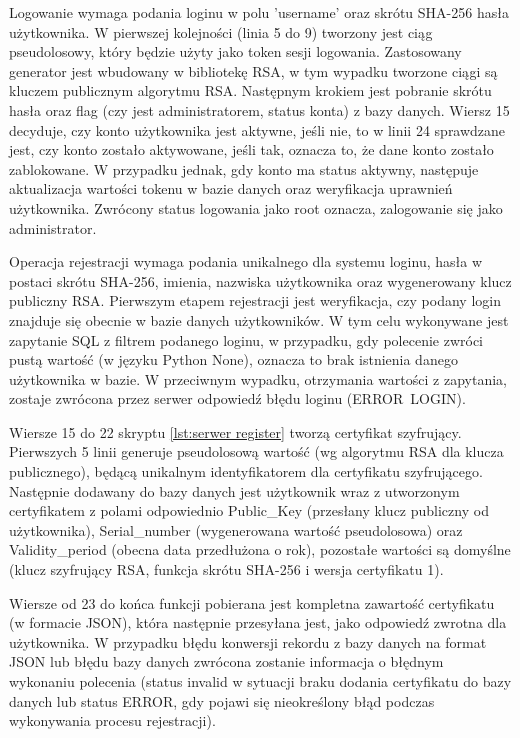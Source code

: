 	Logowanie wymaga podania loginu w polu 'username' oraz skrótu SHA-256 hasła użytkownika. W pierwszej kolejności (linia 5 do 9) tworzony jest ciąg pseudolosowy, który będzie użyty jako token sesji logowania. Zastosowany generator jest wbudowany w bibliotekę RSA, w tym wypadku tworzone ciągi są kluczem publicznym algorytmu RSA. Następnym krokiem jest pobranie skrótu hasła oraz flag (czy jest administratorem, status konta) z bazy danych. Wiersz 15 decyduje, czy konto użytkownika jest aktywne, jeśli nie, to w linii 24 sprawdzane jest, czy konto zostało aktywowane, jeśli tak, oznacza to, że dane konto zostało zablokowane. W przypadku jednak, gdy konto ma status aktywny, następuje aktualizacja wartości tokenu w bazie danych oraz weryfikacja uprawnień użytkownika. Zwrócony status logowania jako root oznacza, zalogowanie się jako administrator.
	
	Operacja rejestracji wymaga podania unikalnego dla systemu loginu, hasła w postaci skrótu SHA-256, imienia, nazwiska użytkownika oraz wygenerowany klucz publiczny RSA. Pierwszym etapem rejestracji jest weryfikacja, czy podany login znajduje się obecnie w bazie danych użytkowników. W tym celu wykonywane jest zapytanie SQL z filtrem podanego loginu, w przypadku, gdy polecenie zwróci pustą wartość (w języku Python None), oznacza to brak istnienia danego użytkownika w bazie. W przeciwnym wypadku, otrzymania wartości z zapytania, zostaje zwrócona przez serwer odpowiedź błędu loginu (ERROR~LOGIN).
	
	Wiersze 15 do 22 skryptu \ref{lst:serwer register} tworzą certyfikat szyfrujący. Pierwszych 5 linii generuje pseudolosową wartość (wg algorytmu RSA dla klucza publicznego), będącą unikalnym identyfikatorem dla certyfikatu szyfrującego. Następnie dodawany do bazy danych jest użytkownik wraz z utworzonym certyfikatem z polami odpowiednio Public\_Key (przesłany klucz publiczny od użytkownika), Serial\_number (wygenerowana wartość pseudolosowa) oraz Validity\_period (obecna data przedłużona o rok), pozostałe wartości są domyślne (klucz szyfrujący RSA, funkcja skrótu SHA-256 i wersja certyfikatu 1).

	Wiersze od 23 do końca funkcji pobierana jest kompletna zawartość certyfikatu (w formacie JSON), która następnie przesyłana jest, jako odpowiedź zwrotna dla użytkownika. W przypadku błędu konwersji rekordu z bazy danych na format JSON lub błędu bazy danych zwrócona zostanie informacja o błędnym wykonaniu polecenia (status invalid w sytuacji braku dodania certyfikatu do bazy danych lub status ERROR, gdy pojawi się nieokreślony błąd podczas wykonywania procesu rejestracji)\cite{programowanie_aplikacji_webowych}.
	\newpage
	
